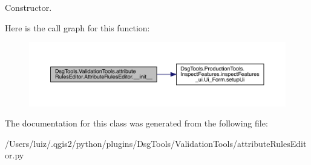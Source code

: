 \begin{DoxyVerb}Constructor.\end{DoxyVerb}
 Here is the call graph for this function\+:
\nopagebreak
\begin{figure}[H]
\begin{center}
\leavevmode
\includegraphics[width=350pt]{class_dsg_tools_1_1_validation_tools_1_1attribute_rules_editor_1_1_attribute_rules_editor_a6d02f1461b839b8b83d65214df579569_cgraph}
\end{center}
\end{figure}


The documentation for this class was generated from the following file\+:\begin{DoxyCompactItemize}
\item 
/\+Users/luiz/.\+qgis2/python/plugins/\+Dsg\+Tools/\+Validation\+Tools/attribute\+Rules\+Editor.\+py\end{DoxyCompactItemize}

